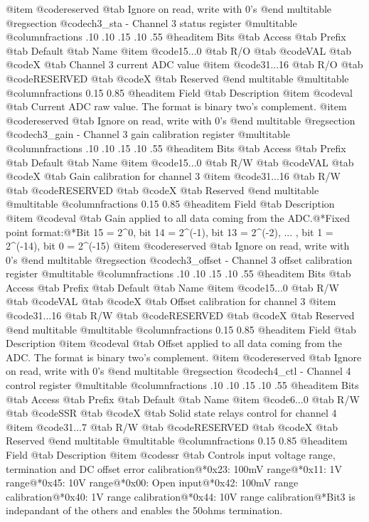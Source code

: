 @item @code{reserved} @tab Ignore on read, write with 0's
@end multitable
@regsection @code{ch3_sta} - Channel 3 status register
@multitable @columnfractions .10 .10 .15 .10 .55
@headitem Bits @tab Access @tab Prefix @tab Default @tab Name
@item @code{15...0}
@tab R/O @tab
@code{VAL}
@tab @code{X} @tab 
Channel 3 current ADC value
@item @code{31...16}
@tab R/O @tab
@code{RESERVED}
@tab @code{X} @tab 
Reserved
@end multitable
@multitable @columnfractions 0.15 0.85
@headitem Field @tab Description
@item @code{val} @tab Current ADC raw value. The format is binary two's complement.
@item @code{reserved} @tab Ignore on read, write with 0's
@end multitable
@regsection @code{ch3_gain} - Channel 3 gain calibration register
@multitable @columnfractions .10 .10 .15 .10 .55
@headitem Bits @tab Access @tab Prefix @tab Default @tab Name
@item @code{15...0}
@tab R/W @tab
@code{VAL}
@tab @code{X} @tab 
Gain calibration for channel 3
@item @code{31...16}
@tab R/W @tab
@code{RESERVED}
@tab @code{X} @tab 
Reserved
@end multitable
@multitable @columnfractions 0.15 0.85
@headitem Field @tab Description
@item @code{val} @tab Gain applied to all data coming from the ADC.@*Fixed point format:@*Bit 15 = 2^0, bit 14 = 2^(-1), bit 13 = 2^(-2), ... , bit 1 = 2^(-14), bit 0 = 2^(-15)
@item @code{reserved} @tab Ignore on read, write with 0's
@end multitable
@regsection @code{ch3_offset} - Channel 3 offset calibration register
@multitable @columnfractions .10 .10 .15 .10 .55
@headitem Bits @tab Access @tab Prefix @tab Default @tab Name
@item @code{15...0}
@tab R/W @tab
@code{VAL}
@tab @code{X} @tab 
Offset calibration for channel 3
@item @code{31...16}
@tab R/W @tab
@code{RESERVED}
@tab @code{X} @tab 
Reserved
@end multitable
@multitable @columnfractions 0.15 0.85
@headitem Field @tab Description
@item @code{val} @tab Offset applied to all data coming from the ADC. The format is binary two's complement.
@item @code{reserved} @tab Ignore on read, write with 0's
@end multitable
@regsection @code{ch4_ctl} - Channel 4 control register
@multitable @columnfractions .10 .10 .15 .10 .55
@headitem Bits @tab Access @tab Prefix @tab Default @tab Name
@item @code{6...0}
@tab R/W @tab
@code{SSR}
@tab @code{X} @tab 
Solid state relays control for channel 4
@item @code{31...7}
@tab R/W @tab
@code{RESERVED}
@tab @code{X} @tab 
Reserved
@end multitable
@multitable @columnfractions 0.15 0.85
@headitem Field @tab Description
@item @code{ssr} @tab Controls input voltage range, termination and DC offset error calibration@*0x23: 100mV range@*0x11: 1V range@*0x45: 10V range@*0x00: Open input@*0x42: 100mV range calibration@*0x40: 1V range calibration@*0x44: 10V range calibration@*Bit3 is indepandant of the others and enables the 50ohms termination.
